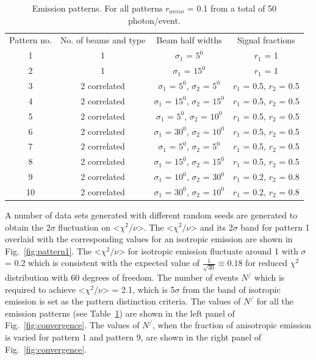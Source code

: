 \begin{table}[h]
  \centering
  \caption{Emission patterns. For all patterns $r_{aniso}$ = 0.1 from a 
  total of 50 photon/event.}
  \label{tab:AnisoPattern}
  \begin{tabular}{|c | c| c | c|}
  \hline
  Pattern no. & No. of beams and type & Beam half widths & Signal fractions \\
  1 & 1 & $\sigma_1$ = $5^{0}$ & $r_1$ = 1 \\
   2 & 1 & $\sigma_1$ = $15^{0}$ & $r_1$ = 1 \\
   3 & 2 correlated & $\sigma_1$ = $5^{0}$, $\sigma_2$ = $5^{0}$ & $r_1$ = 0.5, $r_2$ = 0.5  \\
   4 & 2 correlated & $\sigma_1$ = $15^{0}$, $\sigma_2$ = $15^{0}$ & $r_1$ = 0.5, $r_2$ = 0.5 \\
   5 & 2 correlated & $\sigma_1$ = $5^{0}$, $\sigma_2$ = $10^{0}$ & $r_1$ = 0.5, $r_2$ = 0.5 \\
   6 & 2 correlated & $\sigma_1$ = $30^{0}$, $\sigma_2$ = $10^{0}$ & $r_1$ = 0.5, $r_2$ = 0.5 \\
   7 & 2 correlated & $\sigma_1$ = $5^{0}$, $\sigma_2$ = $5^{0}$ & $r_1$ = 0.5, $r_2$ = 0.5 \\
   8 & 2 correlated & $\sigma_1$ = $15^{0}$, $\sigma_2$ = $15^{0}$ & $r_1$ = 0.5, $r_2$ = 0.5 \\
   9 & 2 correlated & $\sigma_1$ = $10^{0}$, $\sigma_2$ = $30^{0}$ & $r_1$ = 0.2, $r_2$ = 0.8 \\
    10 & 2 correlated & $\sigma_1$ = $30^{0}$, $\sigma_2$ = $10^{0}$ & $r_1$ = 0.2, $r_2$ = 0.8 \\
  \hline
 \end{tabular}
\end{table}

A number of data sets generated with different random seeds are 
generated to obtain the 2$\sigma$ fluctuation on <$\chi^2/\nu$>. The <$\chi^2/\nu$> 
and its 2$\sigma$ band for pattern 1 overlaid with the corresponding values 
for an isotropic emission are shown in Fig.~\ref{fig:pattern1}. The <$\chi^2/\nu$> for 
isotropic emission fluctuate around 1 with $\sigma$ = 0.2 which is consistent with 
the expected value of $\frac{1}{\sqrt{30}} \equiv 0.18$ for reduced $\chi^2$ distribution 
with 60 degrees of freedom. The number of events 
$N^{/}$ which is required to achieve <$\chi^2/\nu$> = 2.1, which is 5$\sigma$ from the 
band of isotropic emission is set as the pattern distinction criteria. The values of 
$N^{/}$ for all the emission patterns (see Table~\ref{tab:AnisoPattern}) are shown 
in the left panel of Fig.~\ref{fig:convergence}. The values of $N^{/}$, when the fraction of anisotropic 
emission is varied for pattern 1 and pattern 9, are shown in the right panel of Fig.~\ref{fig:convergence}. 

